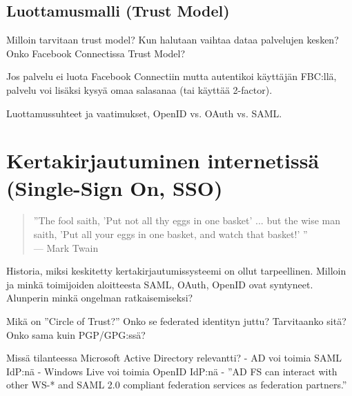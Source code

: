 \documentclass[finnish,gradu]{tktltiki}
\begin{document}
  \subsection{Luottamusmalli (Trust Model)} %
  \label{sub:luottamusmalli_trust_model_}
  Milloin tarvitaan trust model? Kun halutaan vaihtaa dataa palvelujen kesken? Onko Facebook Connectissa Trust Model?

  Jos palvelu ei luota Facebook Connectiin mutta autentikoi käyttäjän FBC:llä, palvelu voi lisäksi kysyä omaa salasanaa (tai käyttää 2-factor).

  Luottamussuhteet ja vaatimukset, OpenID vs. OAuth vs. SAML.



\section{Kertakirjautuminen internetissä (Single-Sign On, SSO)} %
\label{sec:Kertakirjautumisstandardit}
  \begin{quote}
      ''The fool saith, 'Put not all thy eggs in one basket' ...
      but the wise man saith, 'Put all your eggs in one basket, and watch that basket!' ''
      \\--- Mark Twain \cite{twain_eggs_1894}
  \end{quote}

  Historia, miksi keskitetty kertakirjautumissysteemi on ollut tarpeellinen.
  Milloin ja minkä toimijoiden aloitteesta SAML, OAuth, OpenID ovat syntyneet. Alunperin minkä ongelman ratkaisemiseksi?


  Mikä on ''Circle of Trust?'' Onko se federated identityn juttu? Tarvitaanko sitä? Onko sama kuin PGP/GPG:ssä?

  Missä tilanteessa Microsoft Active Directory relevantti?
  - AD voi toimia SAML IdP:nä
  - Windows Live voi toimia OpenID IdP:nä
  - ''AD FS can interact with other WS-* and SAML 2.0 compliant federation services as federation partners.''
\end{document}
